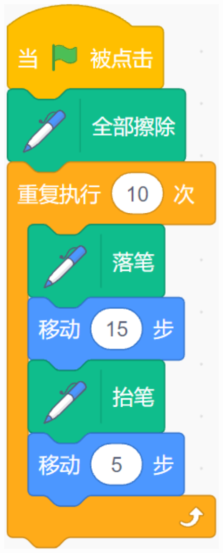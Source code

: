 \documentclass[10pt, a4paper]{article}
\begin{document}
\begin{enumerate}
        \begin{figure}[htbp]
            \centering
            \begin{minipage}[t]{.09\textwidth}
                \centering
                \includegraphics[width=1\textwidth]{1.png}

\end{minipage}
\end{figure}
\end{enumerate}
\end{document}
